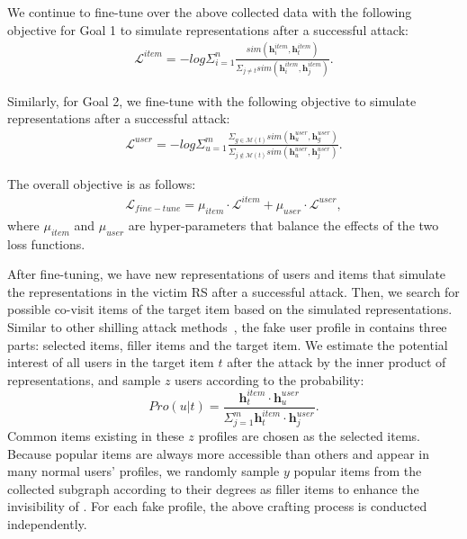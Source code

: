 We continue to fine-tune over the above collected data with the following objective for Goal 1 to simulate representations after a successful attack:
\begin{equation}
	\begin{aligned}
		\mathcal{L}^{item} = -log \Sigma_{i=1}^{n} 
		\frac{sim(\mathbf{h}_i^{item}, \mathbf{h}_t^{item})}{\Sigma_{j\neq t} sim(\mathbf{h}_i^{item}, \mathbf{h}_j^{item})}. 
	\end{aligned}
\end{equation}

Similarly, for Goal 2, we fine-tune with the following objective to simulate representations after a successful attack:
\begin{equation}
	\begin{aligned}
		\mathcal{L}^{user} = -log \Sigma_{u=1}^{m} 
		\frac{\Sigma_{g\in \mathcal{M}(t)} sim(\mathbf{h}^{user}_u, \mathbf{h}^{user}_g)}
		{\Sigma_{j \notin \mathcal{M}(t)} sim(\mathbf{h}^{user}_u, \mathbf{h}^{user}_j)}. 
	\end{aligned}
\end{equation}

The overall objective is as follows:
\begin{equation}
	\begin{aligned}
		\mathcal{L}_{fine-tune}  =\mu_{item}\cdot \mathcal{L}^{item} + \mu_{user}\cdot \mathcal{L}^{user},
	\end{aligned}
\end{equation}
where $\mu_{item}$ and $\mu_{user}$ are hyper-parameters that balance the effects of the two loss functions.


After fine-tuning, we have new representations of users and items that simulate the representations in the victim RS after a successful attack. 
Then, we search for possible co-visit items of the target item based on the simulated representations.
Similar to other shilling attack methods~\citep{LinC0XLY20,abs-2206-11433}, the fake user profile in \ours contains three parts: selected items, filler items and the target item.
We estimate the potential interest of all users in the target item $t$ after the attack by the inner product of representations, and sample $z$ users according to the probability:
\begin{equation}
Pro(u|t) = \frac{\mathbf{h}^{item}_t \cdot \mathbf{h}^{user}_u}{\Sigma_{j=1}^{m} \mathbf{h}^{item}_t \cdot \mathbf{h}^{user}_j}.
\end{equation}
Common items existing in these $z$ profiles are chosen as the selected items.
Because popular items are always more accessible than others and appear in many normal users' profiles, we randomly sample $y$ popular items from the collected subgraph according to their degrees as filler items to enhance the invisibility of \ours.
For each fake profile, the above crafting process is conducted independently.

